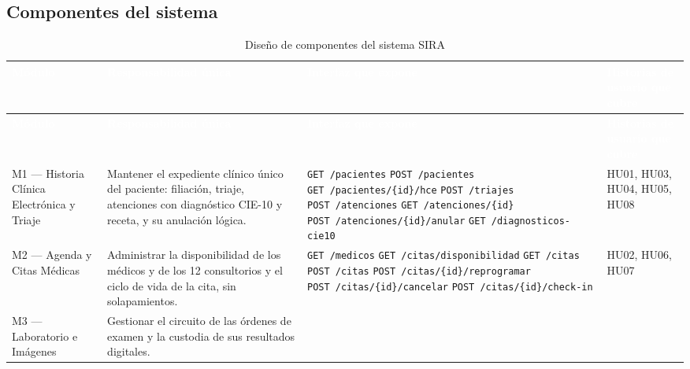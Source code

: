 \documentclass[11pt,a4paper]{article}
\newcommand{\cab}[1]{\textcolor{white}{\textbf{#1}}}
\newcommand{\ep}[2]{{\footnotesize\texttt{\textcolor{guinda}{#1}~#2}}}
\begin{document}
\subsection{Componentes del sistema}

\begin{xltabular}{\linewidth}{|P{2.9cm}|L|P{5.6cm}|P{2.3cm}|}
  \caption{Diseño de componentes del sistema SIRA}\label{tab:componentes}\\
  \hline
  \cab{Módulo} & \cab{Responsabilidad única} & \cab{Interfaz que expone} & \cab{Historias de usuario que cubre} \\ \hline
  \endfirsthead
  \hline
  \cab{Módulo} & \cab{Responsabilidad única} & \cab{Interfaz que expone} & \cab{Historias de usuario que cubre} \\ \hline
  \endhead
  M1 --- Historia Clínica Electrónica y Triaje &
    Mantener el expediente clínico único del paciente: filiación, triaje, atenciones con
    diagnóstico CIE-10 y receta, y su anulación lógica. &
    \ep{GET}{/pacientes} \newline
    \ep{POST}{/pacientes} \newline
    \ep{GET}{/pacientes/\{id\}/hce} \newline
    \ep{POST}{/triajes} \newline
    \ep{POST}{/atenciones} \newline
    \ep{GET}{/atenciones/\{id\}} \newline
    \ep{POST}{/atenciones/\{id\}/anular} \newline
    \ep{GET}{/diagnosticos-cie10} &
    HU01, HU03, HU04, HU05, HU08 \\ \hline
  M2 --- Agenda y Citas Médicas &
    Administrar la disponibilidad de los médicos y de los 12 consultorios y el ciclo de vida
    de la cita, sin solapamientos. &
    \ep{GET}{/medicos} \newline
    \ep{GET}{/citas/disponibilidad} \newline
    \ep{GET}{/citas} \newline
    \ep{POST}{/citas} \newline
    \ep{POST}{/citas/\{id\}/reprogramar} \newline
    \ep{POST}{/citas/\{id\}/cancelar} \newline
    \ep{POST}{/citas/\{id\}/check-in} &
    HU02, HU06, HU07 \\ \hline
  M3 --- Laboratorio e Imágenes &
    Gestionar el circuito de las órdenes de examen y la custodia de sus resultados digitales. &

\end{xltabular}
\end{document}
